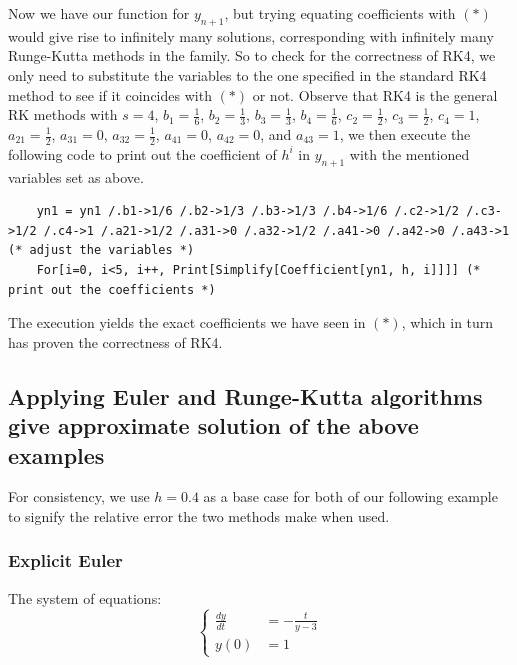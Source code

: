 \documentclass[a4paper]{article}
\begin{document}
Now we have our function for \(y_{n+1}\), but trying equating coefficients with \((*)\) would give rise to infinitely many solutions, corresponding with infinitely many Runge-Kutta methods in the family. So to check for the correctness of RK4, we only need to substitute the variables to the one specified in the standard RK4 method to see if it coincides with \((*)\) or not. Observe that RK4 is the general RK methods with \(s = 4\), \(b_1 = \frac{1}{6}\), \(b_2 = \frac{1}{3}\), \(b_3 = \frac{1}{3}\), \(b_4 = \frac{1}{6}\), \(c_2 = \frac{1}{2}\), \(c_3 = \frac{1}{2}\), \(c_4 = 1\), \(a_{21} = \frac{1}{2}\), \(a_{31} = 0\), \(a_{32} = \frac{1}{2}\), \(a_{41} = 0\), \(a_{42} = 0\), and \(a_{43} = 1\), we then execute the following code to print out the coefficient of \(h^i\) in \(y_{n+1}\) with the mentioned variables set as above.
\begin{mdframed}[leftline=false,rightline=false,backgroundcolor=magenta!10,nobreak=true]
  \begin{verbatim}
    yn1 = yn1 /.b1->1/6 /.b2->1/3 /.b3->1/3 /.b4->1/6 /.c2->1/2 /.c3->1/2 /.c4->1 /.a21->1/2 /.a31->0 /.a32->1/2 /.a41->0 /.a42->0 /.a43->1 (* adjust the variables *)
    For[i=0, i<5, i++, Print[Simplify[Coefficient[yn1, h, i]]]] (* print out the coefficients *)
  \end{verbatim}
\end{mdframed}

The execution yields the exact coefficients we have seen in \((*)\), which in turn has proven the correctness of RK4.

\subsection{Applying Euler and Runge-Kutta algorithms give approximate solution of the above examples}
For consistency, we use \(h = 0.4\) as a base case for both of our following example to signify the relative error the two methods make when used.

\subsubsection{Explicit Euler}
The system of equations:
\begin{equation*}
  \begin{cases}
    \frac{dy}{dt} & = - \frac{t}{y - 3} \\
    y(0)          & = 1
  \end{cases}
\end{equation*}
\end{document}
